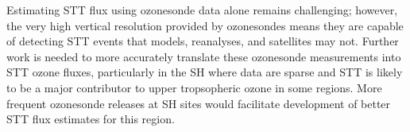 \documentclass[acp, manuscript]{copernicus} %
\providecommand{\DIFdelbegin}{} %
\begin{document}
Estimating STT flux using ozonesonde data alone remains challenging; however, the very high vertical resolution provided by ozonesondes means they are capable of detecting STT events that models, reanalyses, and satellites may not. 
Further work is needed to more accurately translate these ozonesonde measurements into STT ozone fluxes, particularly in the SH where data are sparse and STT is likely to be a major contributor to upper tropsopheric ozone in some regions.
More frequent ozonesonde releases at SH sites would facilitate development of better STT flux estimates for this region.


\appendix

\appendixfigures  %
\appendixtables   %


\DIFdelbegin %
\end{document}
